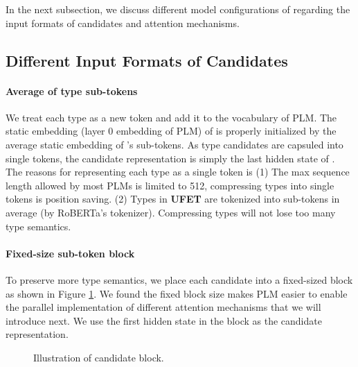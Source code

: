 \documentclass[11pt]{article}
\begin{document}
In the next subsection, we discuss different model configurations of {\bf \textsc{\name}} regarding the input formats of candidates and attention mechanisms.

\subsection{Different Input Formats of Candidates}
\paragraph{Average of type sub-tokens} We treat each type  as a new token  and add it to the vocabulary of PLM. The static embedding (layer 0 embedding of PLM) of  is properly initialized by the average static embedding of 's sub-tokens. As type candidates are capsuled into single tokens, the candidate representation  is simply the last hidden state of . The reasons for representing each type as a single token is (1) The max sequence length allowed by most PLMs is limited to 512, compressing types into single tokens is position saving. (2) Types in {\bf \textsc{UFET}} are tokenized into  sub-tokens in average (by RoBERTa's tokenizer). Compressing types will not lose too many type semantics.
\paragraph{Fixed-size sub-token block} To preserve more type semantics, we place each candidate into a fixed-sized block as shown in Figure \ref{fig:cand_block}. We found the fixed block size makes PLM easier to enable the parallel implementation of different attention mechanisms that we will introduce next. We use the first hidden state in the block as the candidate representation.
\begin{figure}[h]
    \centering
    \caption{Illustration of candidate block.}
    \label{fig:cand_block}
\end{figure}
\end{document}

